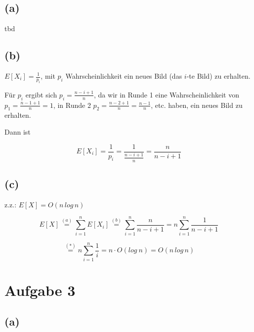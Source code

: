 \documentclass[11pt,a4paper,ngerman]{article}
\begin{document}
\subsection*{(a)}

tbd




\subsection*{(b)}
$E[X_{i}]=\frac{1}{p_{i}}$, mit $p_{i}$ Wahrscheinlichkeit ein neues
Bild (das $i$-te Bild) zu erhalten.

Für $p_{i}$ ergibt sich $p_{i}=\frac{n-i+1}{n}$, da wir in Runde
1 eine Wahrscheinlichkeit von $p_{1}=\frac{n-1+1}{n}=1$, in Runde
2 $p_{2}=\frac{n-2+1}{n}=\frac{n-1}{n}$, etc. haben, ein neues Bild
zu erhalten.

Dann ist

\[
E[X_{i}]=\frac{1}{p_{i}}=\frac{1}{\frac{n-i+1}{n}}=\frac{n}{n-i+1}
\]




\subsection*{(c)}


z.z.: $E[X]=O(n\, log\, n)$

\[
E[X]\stackrel{(a)}{=}\sum_{i=1}^{n}E[X_{i}]\stackrel{(b)}{=}\sum_{i=1}^{n}\frac{n}{n-i+1}=n\sum_{i=1}^{n}\frac{1}{n-i+1}
\]


\[
\stackrel{(*)}{=}n\sum_{i=1}^{n}\frac{1}{i}=n\cdot O(log\: n)=O(n\, log\, n)
\]




\section*{Aufgabe 3}




\subsection*{(a)}
\end{document}
